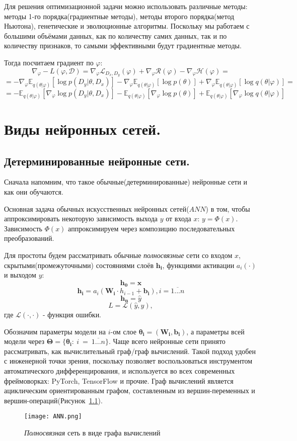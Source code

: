 Для решения оптимизационной задачи можно использовать различные методы: методы 1-го порядка(градиентные методы), методы второго порядка(метод Ньютона), генетические и эволюционные алгоритмы. Поскольку мы работаем с большими объёмами данных,
 как по количеству самих данных, так и по количеству признаков, то самыми эффективными будут градиентные методы.

Тогда посчитаем градиент по $\varphi$:
$$\nabla_{\varphi} -L(\varphi, \mathcal{D}) = \nabla_{\varphi} \mathcal{L}_{D_x, D_y}(\varphi) + \nabla_{\varphi} \mathcal{R}(\varphi) - \nabla_{\varphi} \mathcal{H}(\varphi)=$$
$$= -\nabla_{\varphi} \mathbb{E}_{q(\theta | \varphi)}[\log p(D_y | \theta, D_x)] - \nabla_{\varphi} \mathbb{E}_{q(\theta | \varphi)} [\log p(\theta)] +
\nabla_{\varphi} \mathbb{E}_{q(\theta | \varphi)} [\log q(\theta | \varphi)]=$$
$$= -\mathbb{E}_{ q(\theta | \varphi)}[\nabla_{\varphi}\log p(D_y | \theta, D_x)] - \mathbb{E}_{q(\theta | \varphi)} [\nabla_{\varphi} \log p(\theta)] +
\mathbb{E}_{q(\theta | \varphi)} [\nabla_{\varphi} \log q(\theta | \varphi)]$$

\chapter{Виды нейронных сетей.}

\section{Детерминированные нейронные сети.}

Сначала напомним, что такое обычные(детерминированные) нейронные сети и как они обучаются.

Основная задача обычных искусственных нейронных сетей($ANN$) в том, чтобы аппроксимировать некоторую зависимость выхода $y$ от
 входа $x$: $y = \Phi(x)$. Зависимость $\Phi(x)$ аппроксимируем через композицию последовательных преобразований.

Для простоты будем рассматривать обычные \textit{полносвязные} сети со входом $x$,
 скрытыми(промежуточными) состояниями слоёв $\bm{h_i}$, функциями активации $a_i(\cdot)$ и выходом $y$:
$$\bm{h_0} = \bm{x}$$
$$\bm{h_i} = a_i(\bm{W_i} \cdot h_{i-1} + \bm{b_i}), i = \overline{1...n}$$
$$\bm{h_n} = \widehat{y}$$
$$L = \mathcal{L}(\widehat{y}, y),$$ где $\mathcal{L}(\cdot, \cdot)$ - функция ошибки.

Обозначим параметры модели на $i$-ом слое $\bm{\theta_i} = (\bm{W_i}, \bm{b_i})$, а параметры всей модели через $\bm{\Theta} = \{\bm{\theta_i} :~i~=~\overline{1...n}\}$.
Чаще всего нейронные сети принято рассматривать, как вычислительный граф/граф вычислений.
 Такой подход удобен с инженерной точки зрения, поскольку позволяет воспользоваться инструментом автоматического
 дифференцирования, и используется во всех современных фреймоворках: PyTorch, TensorFlow и прочие.
 Граф вычислений является ациклическим ориентированным графом, составленным из вершин-переменных и вершин-операций(Рисунок~\ref{fig:ANN}).
\begin{figure}[H]
    \centering
    \texttt{[image: ANN.png]}
    \caption{\textit{Полносвязная} сеть в виде графа вычислений}
    \label{fig:ANN}
\end{figure}

